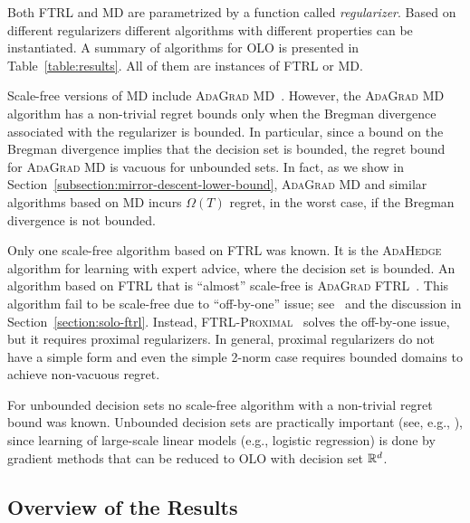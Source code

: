Both \textsc{FTRL} and \textsc{MD} are parametrized by a function called
\emph{regularizer}.
Based on different regularizers different algorithms with
different properties can be instantiated. A summary of algorithms for OLO is
presented in Table~\ref{table:results}.  All of them are instances of
\textsc{FTRL} or \textsc{MD}.

Scale-free versions of \textsc{MD} include \textsc{AdaGrad
MD}~\cite{Duchi-Hazan-Singer-2011}. However, the \textsc{AdaGrad MD} algorithm
has a non-trivial regret bounds only when the Bregman divergence associated with
the regularizer is bounded. In particular, since a bound on the Bregman
divergence implies that the decision set is bounded, the regret bound for
\textsc{AdaGrad MD} is vacuous for unbounded sets. In fact, as we show in
Section~\ref{subsection:mirror-descent-lower-bound}, \textsc{AdaGrad MD} and
similar algorithms based on \textsc{MD} incurs $\Omega(T)$ regret, in the worst
case, if the Bregman divergence is not bounded.

Only one scale-free algorithm based on \textsc{FTRL} was known. It is the
\textsc{AdaHedge}~\cite{de-Rooij-van-Erven-Grunwald-Koolen-2014} algorithm for
learning with expert advice, where the decision set is bounded. An algorithm
based on \textsc{FTRL} that is ``almost'' scale-free is \textsc{AdaGrad
FTRL}~\cite{Duchi-Hazan-Singer-2011}.  This algorithm fail to be scale-free due
to ``off-by-one'' issue; see~\cite{McMahan-2014} and the discussion in
Section~\ref{section:solo-ftrl}. Instead,
\textsc{FTRL-Proximal}~\cite{McMahan-Streeter-2010,McMahan-2014} solves the
off-by-one issue, but it requires proximal regularizers. In general, proximal regularizers do not
have a simple form and even the simple 2-norm case requires bounded domains to achieve non-vacuous regret.

For unbounded decision sets no scale-free algorithm with a non-trivial regret
bound was known. Unbounded decision sets are practically important (see, e.g.,
\cite{Mcmahan-Holt-Sculley-2013}), since learning of large-scale linear models
(e.g., logistic regression) is done by gradient methods that can be reduced to
OLO with decision set $\mathbb{R}^d$.

\subsection{Overview of the Results}

